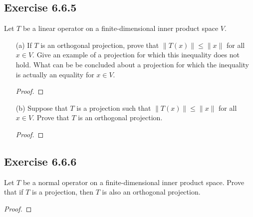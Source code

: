 \subsection*{Exercise 6.6.5} Let \( T  \) be a linear operator on a finite-dimensional inner product space \( V  \).
\begin{enumerate}
    \item[(a)] If \( T  \) is an orthogonal projection, prove that \( \|T(x)\| \leq \|x\| \) for all \( x \in V  \). Give an example of a projection for which this inequality does not hold. What can be be concluded about a projection for which the inequality is actually an equality for \( x \in V  \).
        \begin{proof}
        
        \end{proof}
    \item[(b)] Suppose that \( T  \) is a projection such that \( \|T(x)\| \leq \|x\| \) for all \( x \in V  \). Prove that \( T  \) is an orthogonal projection.
        \begin{proof}
        
        \end{proof}
\end{enumerate}

\subsection*{Exercise 6.6.6} Let \( T \) be a normal operator on a finite-dimensional inner product space. Prove that if \( T  \) is a projection, then \( T  \) is also an orthogonal projection.
\begin{proof}

\end{proof}

